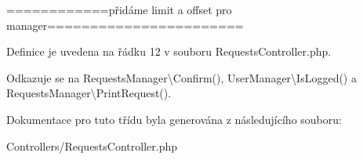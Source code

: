 ============přidáme limit a offset pro manager======================= 

Definice je uvedena na řádku 12 v souboru Requests\-Controller.\-php.



Odkazuje se na Requests\-Manager\textbackslash{}\-Confirm(), User\-Manager\textbackslash{}\-Is\-Logged() a Requests\-Manager\textbackslash{}\-Print\-Request().



Dokumentace pro tuto třídu byla generována z následujícího souboru\-:\begin{DoxyCompactItemize}
\item 
Controllers/Requests\-Controller.\-php\end{DoxyCompactItemize}
